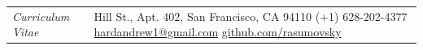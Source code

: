 \documentclass{letter}
\begin{document}

\begin{tabular}{p{}p{}}
  \hfill \newline \href{https://ch.linkedin.com/in/andrew-hard-25b690a5}{\Huge{\color{Maroon}{Andrew Hard}}}
  \newline \LARGE{\textit{Curriculum Vitae}} \newline
  &
  \hfill \newline 1 Hill St., Apt. 402, San Francisco, CA 94110 \newline
  (+1) 628-202-4377 \newline
  \href{mailto:hardandrew1@gmail.com}{hardandrew1@gmail.com} \newline
  \href{https://github.com/rasumovsky}{github.com/rasumovsky}\\
\end{tabular}



\begin{flushleft}
  \Large{\textsc{\textbf{\color{Maroon}{Experience}}}}
  \vspace{1pt}  %
\end{flushleft}
\end{document}
